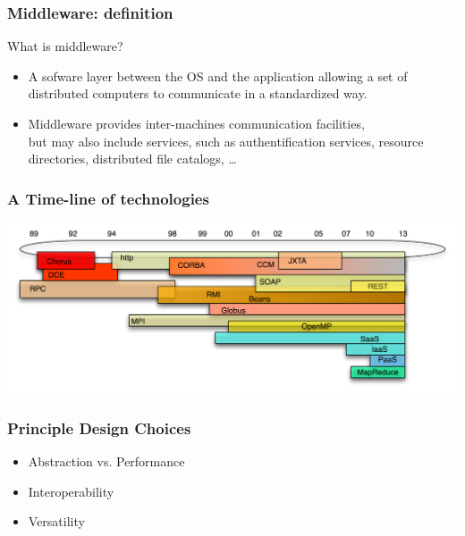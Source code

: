 \documentclass[bigger,hyperref={colorlinks=true, urlcolor=red, plainpages=false, pdfpagelabels, bookmarksnumbered}]{beamer}
\begin{document}
\begin{frame}
\frametitle{Middleware: definition}
\label{sec-1-3}
\begin{block}{What is middleware?}
\label{sec-1-3-1}

\begin{itemize}
\item A sofware layer between the OS and the application allowing 
      a set of distributed computers to communicate in a standardized
      way.
\end{itemize}
\end{block}
\begin{itemize}

\item Middleware provides inter-machines communication facilities,\\
\label{sec-1-3-2}%
but may also include services, such as authentification services,
    resource directories, distributed file catalogs, \ldots{}
     
\end{itemize} %
\end{frame}
\begin{frame}
\frametitle{A Time-line of technologies}
\label{sec-1-4}

  \includegraphics[width=1\linewidth]{../img/timeline.png}
\end{frame}
\begin{frame}
\frametitle{Principle Design Choices}
\label{sec-1-5}

\begin{itemize}
\item Abstraction vs. Performance
\item Interoperability
\item Versatility
\end{itemize}
\end{frame}
\end{document}
